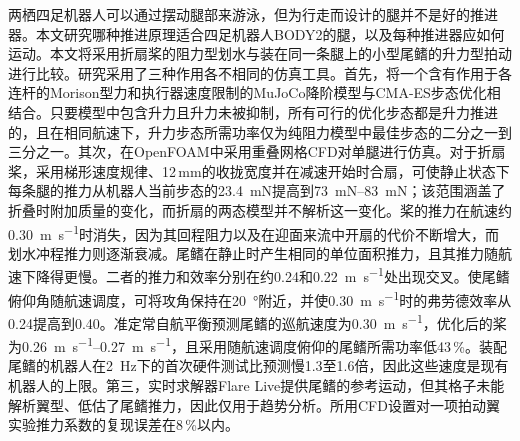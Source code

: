 \thispagestyle{empty}
\vspace*{25mm}
\vspace{6mm}
\noindent
两栖四足机器人可以通过摆动腿部来游泳，但为行走而设计的腿并不是好的推进器。本文研究哪种推进原理适合四足机器人BODY2的腿，以及每种推进器应如何运动。本文将采用折扇桨的阻力型划水与装在同一条腿上的小型尾鳍的升力型拍动进行比较。研究采用了三种作用各不相同的仿真工具。首先，将一个含有作用于各连杆的Morison型力和执行器速度限制的MuJoCo降阶模型与CMA-ES步态优化相结合。只要模型中包含升力且升力未被抑制，所有可行的优化步态都是升力推进的，且在相同航速下，升力步态所需功率仅为纯阻力模型中最佳步态的二分之一到三分之一。其次，在OpenFOAM中采用重叠网格CFD对单腿进行仿真。对于折扇桨，采用梯形速度规律、12\,mm的收拢宽度并在减速开始时合扇，可使静止状态下每条腿的推力从机器人当前步态的\SI{23.4}{\milli\newton}提高到\SIrange{73}{83}{\milli\newton}；该范围涵盖了折叠时附加质量的变化，而折扇的两态模型并不解析这一变化。桨的推力在航速约\SI{0.30}{\metre\per\second}时消失，因为其回程阻力以及在迎面来流中开扇的代价不断增大，而划水冲程推力则逐渐衰减。尾鳍在静止时产生相同的单位面积推力，且其推力随航速下降得更慢。二者的推力和效率分别在约\SI{0.24}{}和\SI{0.22}{\metre\per\second}处出现交叉。使尾鳍俯仰角随航速调度，可将攻角保持在\SI{20}{\degree}附近，并使\SI{0.30}{\metre\per\second}时的弗劳德效率从0.24提高到0.40。准定常自航平衡预测尾鳍的巡航速度为\SI{0.30}{\metre\per\second}，优化后的桨为\SIrange{0.26}{0.27}{\metre\per\second}，且采用随航速调度俯仰的尾鳍所需功率低43\,\%。装配尾鳍的机器人在\SI{2}{\hertz}下的首次硬件测试比预测慢1.3至1.6倍，因此这些速度是现有机器人的上限。第三，实时求解器Flare Live提供尾鳍的参考运动，但其格子未能解析翼型、低估了尾鳍推力，因此仅用于趋势分析。所用CFD设置对一项拍动翼实验推力系数的复现误差在8\,\%以内。

